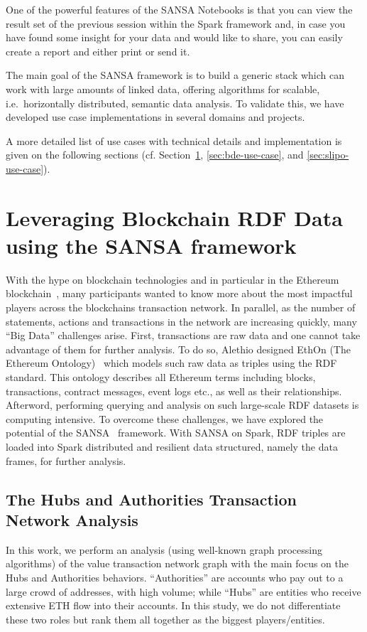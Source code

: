 One of the powerful features of the SANSA Notebooks is that you can view the result set of the previous session within the Spark framework and, in case you have found some insight for your data and would like to share, you can easily create a report and either print or send it.


The main goal of the SANSA framework is to build a generic stack which can work with large amounts of linked data, offering algorithms for scalable, i.e.~horizontally distributed, semantic data analysis.
To validate this, we have developed use case implementations in several domains and projects.
   
A more detailed list of use cases with technical details and implementation is given on the following sections (cf. Section~\ref{sec:alethio-use-case}, \ref{sec:bde-use-case}, and \ref{sec:slipo-use-case}).

\section{Leveraging Blockchain RDF Data using the SANSA framework}
\label{sec:alethio-use-case}
With the hype on blockchain technologies and in particular in the Ethereum blockchain~\cite{wood2014ethereum}, many participants wanted to know more about the most impactful players across the blockchains transaction network.
In parallel, as the number of statements, actions and transactions in the network are increasing quickly, many ``Big Data'' challenges arise.
First, transactions are raw data and one cannot take advantage of them for further analysis.
To do so, Alethio designed EthOn (The Ethereum Ontology)~\cite{pfeffer2016ethon} which models such raw data as triples using the \gls{RDF} standard.
This ontology describes all Ethereum terms including blocks, transactions, contract messages, event logs etc., as well as their relationships.
Afterword, performing querying and analysis on such large-scale \gls{RDF} datasets is computing intensive.
To overcome these challenges, we have explored the potential of the SANSA~\cite{lehmann-2017-sansa-iswc} framework.
With SANSA on Spark, \gls{RDF} triples are loaded into Spark distributed and resilient data structured, namely the data frames, for further analysis.

\subsection{The Hubs and Authorities Transaction Network Analysis}
\label{sec:the-hub-and-authorities-use-case}
In this work, we perform an analysis (using well-known graph processing algorithms) of the value transaction network graph with the main focus on the Hubs and Authorities behaviors.
``Authorities'' are accounts who pay out to a large crowd of addresses, with high volume; while ``Hubs'' are entities who receive extensive \gls{ETH} flow into their accounts.
In this study, we do not differentiate these two roles but rank them all together as the biggest players/entities.

